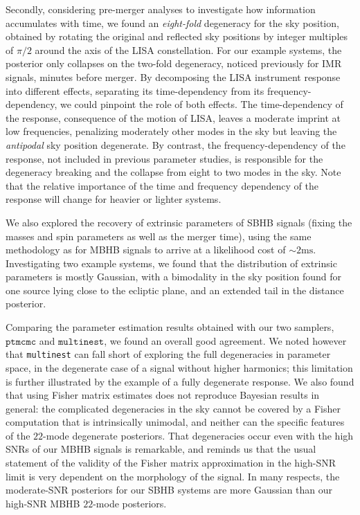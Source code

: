 \documentclass[aps,showpacs,twocolumn,prd,superscriptaddress,nofootinbib]{revtex4-1}
\begin{document}
Secondly, considering pre-merger analyses to investigate how information accumulates with time, we found an \textit{eight-fold} degeneracy for the sky position, obtained by rotating the original and reflected sky positions by integer multiples of $\pi/2$ around the axis of the LISA constellation. For our example systems, the posterior only collapses on the two-fold degeneracy, noticed previously for IMR signals, minutes before merger. By decomposing the LISA instrument response into different effects, separating its time-dependency from its frequency-dependency, we could pinpoint the role of both effects. The time-dependency of the response, consequence of the motion of LISA, leaves a moderate imprint at low frequencies, penalizing moderately other modes in the sky but leaving the \textit{antipodal} sky position degenerate. By contrast, the frequency-dependency of the response, not included in previous parameter studies, is responsible for the degeneracy breaking and the collapse from eight to two modes in the sky. Note that the relative importance of the time and frequency dependency of the response will change for heavier or lighter systems.

We also explored the recovery of extrinsic parameters of SBHB signals (fixing the masses and spin parameters as well as the merger time), using the same methodology as for MBHB signals to arrive at a likelihood cost of $\sim 2 \mathrm{ms}$. Investigating two example systems, we found that the distribution of extrinsic parameters is mostly Gaussian, with a bimodality in the sky position found for one source lying close to the ecliptic plane, and an extended tail in the distance posterior.

Comparing the parameter estimation results obtained with our two samplers, $\texttt{ptmcmc}$ and $\texttt{multinest}$, we found an overall good agreement. We noted however that \texttt{multinest} can fall short of exploring the full degeneracies in parameter space, in the degenerate case of a signal without higher harmonics; this limitation is further illustrated by the example of a fully degenerate response. We also found that using Fisher matrix estimates does not reproduce Bayesian results in general: the complicated degeneracies in the sky cannot be covered by a Fisher computation that is intrinsically unimodal, and neither can the specific features of the $22$-mode degenerate posteriors. That degeneracies occur even with the high SNRs of our MBHB signals is remarkable, and reminds us that the usual statement of the validity of the Fisher matrix approximation in the high-SNR limit is very dependent on the morphology of the signal. In many respects, the moderate-SNR posteriors for our SBHB systems are more Gaussian than our high-SNR MBHB $22$-mode posteriors.
\end{document}
